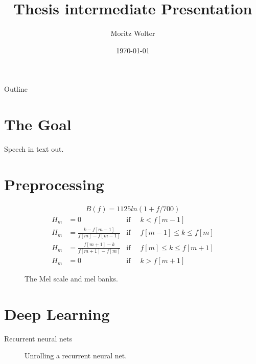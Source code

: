 \documentclass{beamer}
\title{Thesis intermediate Presentation}
\author{Moritz Wolter}
\date{\today}
\begin{document}
\begin{frame}
  \titlepage
\end{frame}


\begin{frame}{Outline}
  \tableofcontents
\end{frame}

\section{The Goal}
\begin{frame}
Speech in text out.
\end{frame}



\section{Preprocessing}
\begin{frame}
\begin{align}
	B(f) = 1125 ln(1 + f / 700)
\end{align}
\begin{align}
	H_m &= 0 				                       & \text{if}\;\; & k < f[m-1] \\
	H_m &= \frac{k      - f[m-1] }{f[m] - f[m-1]}  &\text{if}\;\; & f[m-1] \leq k \leq f[m] \\
	H_m &= \frac{f[m+1] - k      }{f[m + 1] - f[m]}&\text{if}\;\; & f[m] \leq k \leq f[m+1] \\
	H_m &= 0									   &\text{if}\;\; & k > f[m+1] 
\end{align}
\end{frame}

\begin{frame}
\begin{figure}
	
	
	\caption{The Mel scale and mel banks.}
	\label{fig:melBank}
\end{figure}
\end{frame}


\section{Deep Learning}

\begin{frame}{Recurrent neural nets}
\begin{figure}
	
	\caption{Unrolling a recurrent neural net.}
\end{figure}
\end{frame}
\end{document}

